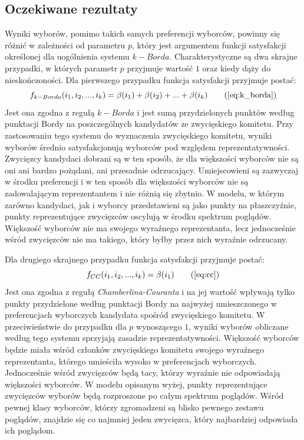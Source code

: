 \documentclass[polish,11pt]{aghthesis}
\begin{document}
\subsection{Oczekiwane rezultaty}
Wyniki wyborów, pomimo takich samych preferencji wyborców, powinny się różnić w
zależności od parametru $p$, który jest argumentem funkcji satysfakcji określonej dla
uogólnienia systemu $k-Borda$. Charakterystyczne są dwa skrajne przypadki, w których
parametr $p$ przyjmuje wartość $1$ oraz kiedy dąży do nieskończoności. Dla pierwszego
przypadku funkcja satysfakcji przyjmuje postać: 
\begin{equation}
f_{k-Borda}(i_1, i_2, ..., i_k) = \beta(i_1) + \beta(i_2) + ... + \beta(i_k) \tag{\ref{eq:k_borda}}
\end{equation}
Jest ona zgodna z regułą $k-Borda$ i jest sumą przydzielonych punktów według punktacji
Bordy na poszczególnych kandydatów ze zwycięskiego komitetu. Przy zastosowaniu tego
systemu do wyznaczenia zwycięskiego komitetu, wyniki wyborów średnio satysfakcjonują
wyborców pod względem reprezentatywności. Zwycięzcy kandydaci dobrani są w ten
sposób, że dla większości wyborców nie są oni ani bardzo pożądani, ani przesadnie
odrzucający. Umiejscowieni są zazwyczaj w środku preferencji i w ten sposób dla większości
wyborców nie są zadowalającym reprezentantem i nie różnią się zbytnio. W modelu, w
którym zarówno kandydaci, jak i wyborcy przedstawieni są jako punkty na płaszczyźnie,
punkty reprezentujące zwycięzców oscylują w środku spektrum poglądów. Większość wyborców nie ma swojego wyraźnego reprezentanta, lecz jednocześnie wśród zwycięzców nie ma takiego, który byłby przez nich wyraźnie odrzucany. 

\noindent Dla drugiego skrajnego przypadku funkcja satysfakcji przyjmuje postać: 
\begin{equation}
f_{CC}(i_1, i_2, ..., i_k) = \beta(i_1)\tag{\ref{eq:cc}}
\end{equation}
Jest ona zgodna z regułą \textit{Chamberlina-Couranta} i na jej wartość wpływają tylko punkty przydzielone według punktacji Bordy na najwyżej umieszczonego w preferencjach wyborczych kandydata spośród zwycięskiego komitetu. W przeciwieństwie do przypadku dla $p$ wynoszącego $1$, wyniki wyborów obliczane według tego systemu sprzyjają zasadzie reprezentatywności. Większość wyborców będzie miała wśród członków zwycięskiego komitetu swojego wyraźnego reprezentanta, którego umieściła wysoko w preferencjach wyborczych. Jednocześnie wśród zwycięzców będą tacy, którzy wyraźnie nie odpowiadają większości wyborców. W modelu opisanym wyżej, punkty reprezentujące zwycięzców wyborów będą rozproszone po całym spektrum poglądów. Wśród pewnej klasy wyborców, którzy zgromadzeni są blisko pewnego zestawu poglądów, znajdzie się co najmniej jeden zwycięzca, który najbardziej odpowiada ich poglądom.
\end{document}
